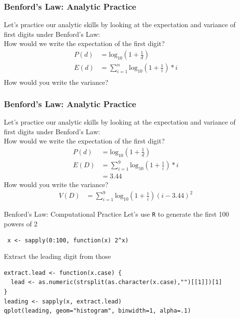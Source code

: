 \documentclass{beamer}
\begin{document}
\begin{frame}\frametitle{Benford's Law: Analytic Practice}
Let's practice our analytic skills by looking at the expectation and variance of first digits under Benford's Law: \\
How would we write the expectation of the first digit?
\begin{align*}
P(d) &= \text{log}_{10}(1 + \frac{1}{d}) \\
E(d) &= \sum_{i=1}^n \text{log}_{10}(1 + \frac{1}{i})*i \\
\end{align*}
How would you write the variance?
\end{frame}

\begin{frame}\frametitle{Benford's Law: Analytic Practice}
Let's practice our analytic skills by looking at the expectation and variance of first digits under Benford's Law: \\
How would we write the expectation of the first digit?
\begin{align*}
P(d) &= \text{log}_{10}(1 + \frac{1}{d}) \\
E(D) &= \sum_{i=1}^9 \text{log}_{10}(1 + \frac{1}{i})*i \\
&= 3.44 
\end{align*}
How would you write the variance?
\begin{align*}
V(D) &= \sum_{i=1}^9 \text{log}_{10}(1 + \frac{1}{i})(i - 3.44)^2  
\end{align*}
\end{frame}

\begin{frame}[fragile]{Benford's Law: Computational Practice}
Let's use \texttt{R} to generate the first 100 powers of 2
\pause
\begin{footnotesize}
\begin{verbatim} x <- sapply(0:100, function(x) 2^x) \end{verbatim}
\end{footnotesize}

Extract the leading digit from those
\pause
\begin{footnotesize}
\begin{verbatim}
extract.lead <- function(x.case) {
  lead <- as.numeric(strsplit(as.character(x.case),"")[[1]])[1]
}
leading <- sapply(x, extract.lead)
qplot(leading, geom="histogram", binwidth=1, alpha=.1)
\end{verbatim}
\end{footnotesize}
\end{frame}
\end{document}
